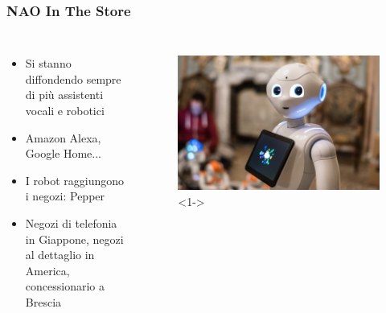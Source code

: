 \documentclass[aspectratio=169]{beamer}
\begin{document}
\begin{frame}
\frametitle{NAO In The Store}
\begin{columns}
		\begin{itemize}
			\item<1->Si stanno diffondendo sempre di più assistenti vocali e robotici
			\item<2->Amazon Alexa, Google Home...
			\item<3->I robot raggiungono i negozi: Pepper
			\item<4->Negozi di telefonia in Giappone, negozi al dettaglio in America, concessionario a Brescia
		\end{itemize}
		\begin{figure}[ht]
		\begin{center}
		\includegraphics[width=.9\textwidth]{pepper}<1->
		\end{center}
		\end{figure}
\end{columns}
\end{frame}
\end{document}
